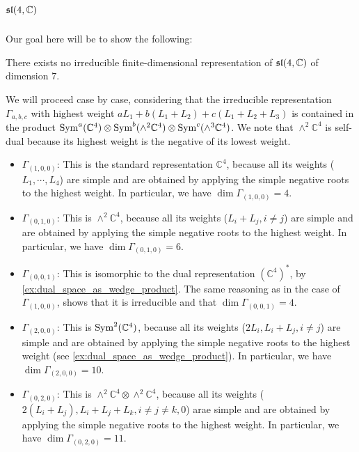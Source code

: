 \documentclass{report}
\begin{document}
\section{$\operatorname{{\mathfrak{sl}}}(4,\mathbb C)$}
Our goal here will be to show the following:
\begin{proposition}
    There exists no irreducible finite-dimensional representation of $\operatorname{{\mathfrak{sl}}}(4, \mathbb C)$ of dimension $7$.
\end{proposition}
We will proceed case by case, considering that the irreducible representation $\Gamma_{a, b, c}$ with highest weight $aL_1 + b(L_1 + L_2) + c(L_1 + L_2 + L_3)$ is contained in the product $\operatorname{Sym}^a(\mathbb C^4) \otimes \operatorname{Sym}^b(\wedge^2 \mathbb C^4) \otimes \operatorname{Sym}^c(\wedge^3 \mathbb C^4)$.
We note that $\wedge^2 \mathbb C^4$ is self-dual because its highest weight is the negative of its lowest weight.
\begin{itemize}
    \item {\bf \underline{$\Gamma_{(1,0,0)}$}}: This is the standard representation $\mathbb C^4$, because all its weights ($L_1, \cdots, L_4$) are simple and are obtained by applying the simple negative roots to the highest weight.
    In particular, we have $\dim \Gamma_{(1,0,0)} = 4$.
    \item {\bf \underline{$\Gamma_{(0,1,0)}$}}: This is $\wedge^2 \mathbb C^4$, because all its weights ($L_i + L_j, i \neq j$) are simple and are obtained by applying the simple negative roots to the highest weight.
    In particular, we have $\dim \Gamma_{(0,1,0)} = 6$.
    \item {\bf \underline{$\Gamma_{(0,0,1)}$}}: This is isomorphic to the dual representation $(\mathbb C^4)^*$, by \cref{ex:dual_space_as_wedge_product}. The same reasoning as in the case of $\Gamma_{(1,0,0)}$, shows that it is irreducible and that $\dim \Gamma_{(0,0,1)} = 4$.
    \item {\bf \underline{$\Gamma_{(2,0,0)}$}}: This is $\operatorname{Sym}^2(\mathbb C^4)$, because all its weights ($2L_i, L_i + L_j, i \neq j$) are simple and are obtained by applying the simple negative roots to the highest weight (see \cref{ex:dual_space_as_wedge_product}).
    In particular, we have $\dim \Gamma_{(2,0,0)} = 10$.
    \item {\bf \underline{$\Gamma_{(0,2,0)}$}}: This is $\wedge^2 \mathbb C^4 \otimes \wedge^2 \mathbb C^4$, because all its weights ($2(L_i + L_j), L_i + L_j + L_k, i \neq j \neq k, 0$) arae simple and are obtained by applying the simple negative roots to the highest weight.
    In particular, we have $\dim \Gamma_{(0,2,0)} = 11$.

\end{itemize}
\end{document}
